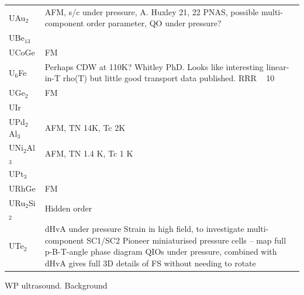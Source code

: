 \begin{table}
  \begin{tabular}{l l}
    UAu$_2$ &
    AFM, s/c under pressure, A. Huxley 21, 22 PNAS, possible multi-component order parameter, QO under pressure?
    \\

    UBe$_{13}$ & \\
    
    UCoGe & 
    FM \\
    
    U$_6$Fe & 
    Perhaps CDW at 110K? Whitley PhD. Looks like interesting linear-in-T rho(T) but little good transport data published. RRR ~ 10 \\
    
    UGe$_2$  & FM \\
    UIr & \\
    UPd$_2$Al$_3$ & 
    AFM, TN 14K, Tc 2K
    \\

    UNi$_2$Al$_3$ &
    AFM, TN 1.4 K, Tc 1 K
    \\

    UPt$_3$ & \\
  
    URhGe & 
    FM
    \\

    URu$_2$Si$_2$ & 
    Hidden order \\
  
    UTe$_2$ & 
      dHvA under pressure
      Strain in high field, to investigate multi-component SC1/SC2
      Pioneer miniaturised pressure cells – map full p-B-T-angle phase diagram 
      QIOs under pressure, combined with dHvA gives full 3D details of FS without needing to rotate \\
  \end{tabular}
\end{table}

WP ultrasound.
Background

